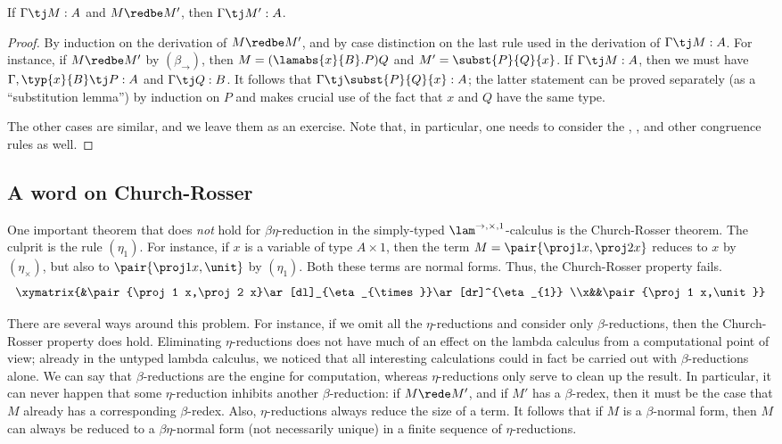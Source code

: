 \documentclass[12pt]{article}
\begin{document}
\begin{theorem}
  If $\Gamma\tj M:A$ and $M\redbe M'$, then $\Gamma\tj M':A$. 
\end{theorem}

\begin{proof}
  By induction on the derivation of $M\redbe M'$, and by case
  distinction on the last rule used in the derivation of $\Gamma\tj
  M:A$. For instance, if $M\redbe M'$ by $(\beta_{\to})$, then
  $M=(\lamabs{x}{B}.P)Q$ and $M'=\subst{P}{Q}{x}$. If $\Gamma\tj M:A$,
  then we must have $\Gamma,\typ{x}{B}\tj P:A$ and $\Gamma\tj Q:B$.
  It follows that $\Gamma\tj\subst{P}{Q}{x}:A$; the latter statement
  can be proved separately (as a ``substitution lemma'') by induction
  on $P$ and makes crucial use of the fact that $x$ and $Q$ have the
  same type. 
  
  The other cases are similar, and we leave them as an exercise. Note
  that, in particular, one needs to consider the {},
  {\nrule{\xi}}, and other congruence rules as well. \eot
\end{proof}

\subsection{A word on Church-Rosser}

One important theorem that does {\em not} hold for
$\beta\eta$-reduction in the simply-typed
$\lam^{\to,\times,1}$-calculus is the Church-Rosser theorem. The
culprit is the rule $(\eta_{1})$. For instance, if $x$ is a variable
of type $A\times 1$, then the term $M=\pair{\proj1 x,\proj2 x}$
reduces to $x$ by $(\eta_{\times})$, but also to $\pair{\proj1
  x,\unit}$ by $(\eta_{1})$. Both these terms are normal forms.
Thus, the Church-Rosser property fails. 
\[ \xymatrix{&\pair{\proj1 x,\proj2 x}\ar[dl]_{\eta_{\times}}\ar[dr]^{\eta_{1}}
  \\x&&\pair{\proj1 x,\unit}}
\]

There are several ways around this problem.  For instance, if we omit
all the $\eta$-reductions and consider only $\beta$-reductions, then
the Church-Rosser property does hold. Eliminating $\eta$-reductions
does not have much of an effect on the lambda calculus from a
computational point of view; already in the untyped lambda calculus,
we noticed that all interesting calculations could in fact be carried
out with $\beta$-reductions alone. We can say that $\beta$-reductions
are the engine for computation, whereas $\eta$-reductions only serve
to clean up the result. In particular, it can never happen that some
$\eta$-reduction inhibits another $\beta$-reduction: if $M\rede M'$,
and if $M'$ has a $\beta$-redex, then it must be the case that $M$
already has a corresponding $\beta$-redex. Also, $\eta$-reductions
always reduce the size of a term. It follows that if $M$ is a
$\beta$-normal form, then $M$ can always be reduced to a
$\beta\eta$-normal form (not necessarily unique) in a finite sequence
of $\eta$-reductions.
\end{document}
